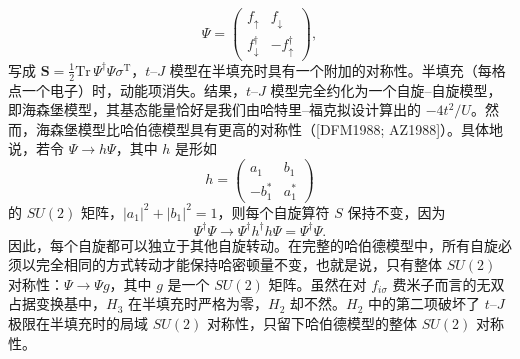 \begin{equation*}
\Psi=\begin{pmatrix}f_{\uparrow} & f_{\downarrow}\\ f^{\dagger}_{\downarrow} & -f^{\dagger}_{\uparrow}\end{pmatrix},\tag{16.103}
\end{equation*}
写成 $\mathbf{S}=\frac{1}{2}\mathrm{Tr}\,\Psi^{\dagger}\Psi\sigma^{\mathrm{T}}$，$t$--$J$ 模型在半填充时具有一个附加的对称性。半填充（每格点一个电子）时，动能项消失。结果，$t$--$J$ 模型完全约化为一个自旋--自旋模型，即海森堡模型，其基态能量恰好是我们由哈特里--福克拟设计算出的 $-4t^{2}/U$。然而，海森堡模型比哈伯德模型具有更高的对称性（[DFM1988; AZ1988]）。具体地说，若令 $\Psi\to h\Psi$，其中 $h$ 是形如
\begin{equation*}
h=\begin{pmatrix}a_{1} & b_{1}\\ -b^{*}_{1} & a^{*}_{1}\end{pmatrix}\tag{16.104}
\end{equation*}
的 $SU(2)$ 矩阵，$|a_{1}|^{2}+|b_{1}|^{2}=1$，则每个自旋算符 $S$ 保持不变，因为
\begin{equation*}
\Psi^{\dagger}\Psi\to\Psi^{\dagger}h^{\dagger}h\Psi=\Psi^{\dagger}\Psi.\tag{16.105}
\end{equation*}
因此，每个自旋都可以独立于其他自旋转动。在完整的哈伯德模型中，所有自旋必须以完全相同的方式转动才能保持哈密顿量不变，也就是说，只有整体 $SU(2)$ 对称性：$\Psi\to\Psi g$，其中 $g$ 是一个 $SU(2)$ 矩阵。虽然在对 $f_{i\sigma}$ 费米子而言的无双占据变换基中，$H_{3}$ 在半填充时严格为零，$H_{2}$ 却不然。$H_{2}$ 中的第二项破坏了 $t$--$J$ 极限在半填充时的局域 $SU(2)$ 对称性，只留下哈伯德模型的整体 $SU(2)$ 对称性。

